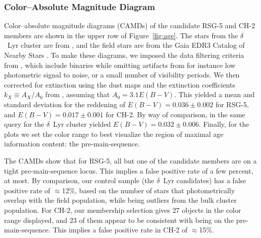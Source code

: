 \documentclass[12pt,twocolumn]{aastex63}
\begin{document}
\subsubsection{Color--Absolute Magnitude Diagram}
\label{sec:camd}

Color--absolute magnitude diagrams (CAMDs) of the candidate RSG-5 and
CH-2 members are shown in the upper row of Figure~\ref{fig:age}.  The
stars from the $\delta$~Lyr cluster are from
\citet{bouma_kep1627_2022}, and the field stars are from the Gaia EDR3
Catalog of Nearby Stars \citep{gaia_gcns_2021}.  To make these
diagrams, we imposed the data filtering criteria from
\citet[][Appendix B]{GaiaCollaboration2018}, which include binaries
while omitting artifacts from for instance low
photometric signal to noise, or a small number of visibility periods.
We then corrected for extinction using the
\citet{lallement_threedimensional_2018} dust
maps and the extinction
coefficients $k_X\equiv A_X/A_0$ from \citet{GaiaCollaboration2018},
assuming that $A_0 = 3.1 E(B-V)$.  This yielded a mean and standard
deviation for the reddening of $E(B-V)=0.036\pm0.002$ for RSG-5, and
$E(B-V)=0.017\pm0.001$ for CH-2.  By way of comparison, in
\citet{bouma_kep1627_2022} the same query for the $\delta$~Lyr cluster
yielded $E(B-V)=0.032\pm0.006$.  Finally, for the plots we set the
color range to best visualize the region of maximal age information
content: the pre-main-sequence.

The CAMDs show that for RSG-5, all but one of the candidate
members are on a tight pre-main-sequence locus.  This implies a false
positive rate of a few percent, at most.  By comparison, our control
sample (the $\delta$~Lyr candidates) has a false positive rate of
$\approx$12\%, based on the number of stars that photometrically
overlap with the field population, while being outliers from the bulk
cluster population.  For CH-2, our membership selection gives 27
objects in the color range displayed, and 23 of them appear to be
consistent with being on the pre-main-sequence.  This implies a false
positive rate in CH-2 of $\approx$15\%.
\end{document}
